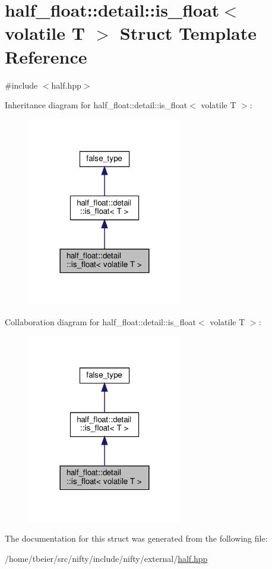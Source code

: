 \hypertarget{structhalf__float_1_1detail_1_1is__float_3_01volatile_01T_01_4}{}\section{half\+\_\+float\+:\+:detail\+:\+:is\+\_\+float$<$ volatile T $>$ Struct Template Reference}
\label{structhalf__float_1_1detail_1_1is__float_3_01volatile_01T_01_4}


{\ttfamily \#include $<$half.\+hpp$>$}



Inheritance diagram for half\+\_\+float\+:\+:detail\+:\+:is\+\_\+float$<$ volatile T $>$\+:
\nopagebreak
\begin{figure}[H]
\begin{center}
\leavevmode
\includegraphics[width=192pt]{structhalf__float_1_1detail_1_1is__float_3_01volatile_01T_01_4__inherit__graph}
\end{center}
\end{figure}


Collaboration diagram for half\+\_\+float\+:\+:detail\+:\+:is\+\_\+float$<$ volatile T $>$\+:
\nopagebreak
\begin{figure}[H]
\begin{center}
\leavevmode
\includegraphics[width=192pt]{structhalf__float_1_1detail_1_1is__float_3_01volatile_01T_01_4__coll__graph}
\end{center}
\end{figure}


The documentation for this struct was generated from the following file\+:\begin{DoxyCompactItemize}
\item 
/home/tbeier/src/nifty/include/nifty/external/\hyperlink{half_8hpp}{half.\+hpp}\end{DoxyCompactItemize}
